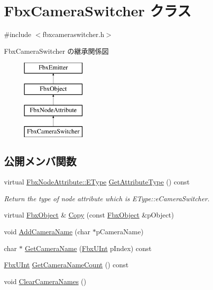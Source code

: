 \hypertarget{class_fbx_camera_switcher}{}\section{Fbx\+Camera\+Switcher クラス}
\label{class_fbx_camera_switcher}


{\ttfamily \#include $<$fbxcameraswitcher.\+h$>$}

Fbx\+Camera\+Switcher の継承関係図\begin{figure}[H]
\begin{center}
\leavevmode
\includegraphics[height=4.000000cm]{class_fbx_camera_switcher}
\end{center}
\end{figure}
\subsection*{公開メンバ関数}
\begin{DoxyCompactItemize}
\item 
virtual \hyperlink{class_fbx_node_attribute_a08e1669d3d1a696910756ab17de56d6a}{Fbx\+Node\+Attribute\+::\+E\+Type} \hyperlink{class_fbx_camera_switcher_ad42aacc90ece1f0295e51db102ae48ad}{Get\+Attribute\+Type} () const
\begin{DoxyCompactList}\small\item\em Return the type of node attribute which is E\+Type\+::e\+Camera\+Switcher. \end{DoxyCompactList}\item 
virtual \hyperlink{class_fbx_object}{Fbx\+Object} \& \hyperlink{class_fbx_camera_switcher_a4f9ed75fe53a90e3bfae94415714fc99}{Copy} (const \hyperlink{class_fbx_object}{Fbx\+Object} \&p\+Object)
\item 
void \hyperlink{class_fbx_camera_switcher_a0b10a6c548f79eb7b3917807429ac8bb}{Add\+Camera\+Name} (char $\ast$p\+Camera\+Name)
\item 
char $\ast$ \hyperlink{class_fbx_camera_switcher_a9cfc17b2e772a32cdbb0f15fffb18eda}{Get\+Camera\+Name} (\hyperlink{fbxtypes_8h_ae9fb141d8158a730aa85ec5ff2ea3f6b}{Fbx\+U\+Int} p\+Index) const
\item 
\hyperlink{fbxtypes_8h_ae9fb141d8158a730aa85ec5ff2ea3f6b}{Fbx\+U\+Int} \hyperlink{class_fbx_camera_switcher_a5311eac98442cb069497ea8b09b3717d}{Get\+Camera\+Name\+Count} () const
\item 
void \hyperlink{class_fbx_camera_switcher_a19e4199ca22422dd83db62938c7f7b55}{Clear\+Camera\+Names} ()
\end{DoxyCompactItemize}
